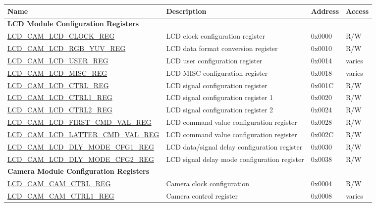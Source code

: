 \begin{longtable}{ | p{6.4cm} | p{6.8cm} | p{1.3cm} | p{1cm} | }
\hline\rowcolor{lightgray}
\textbf{Name} & \textbf{Description} &  \textbf{Address} & \textbf{Access}   \\ \hline
\endhead
\multicolumn{4}{|l|}{\textbf{LCD Module Configuration Registers}} \\ \hline
\hyperref[regdesc:LCDCAMLCDCLOCKREG]{LCD\_CAM\_LCD\_CLOCK\_REG} & LCD clock configuration register & 0x0000 & R/W \\ \hline
\hyperref[regdesc:LCDCAMLCDRGBYUVREG]{LCD\_CAM\_LCD\_RGB\_YUV\_REG} & LCD data format conversion register & 0x0010 & R/W \\ \hline
\hyperref[regdesc:LCDCAMLCDUSERREG]{LCD\_CAM\_LCD\_USER\_REG} & LCD user configuration register & 0x0014 & varies \\ \hline
\hyperref[regdesc:LCDCAMLCDMISCREG]{LCD\_CAM\_LCD\_MISC\_REG} & LCD MISC configuration register & 0x0018 & varies \\ \hline
\hyperref[regdesc:LCDCAMLCDCTRLREG]{LCD\_CAM\_LCD\_CTRL\_REG} & LCD signal configuration register & 0x001C & R/W \\ \hline
\hyperref[regdesc:LCDCAMLCDCTRL1REG]{LCD\_CAM\_LCD\_CTRL1\_REG} & LCD signal configuration register 1 & 0x0020 & R/W \\ \hline
\hyperref[regdesc:LCDCAMLCDCTRL2REG]{LCD\_CAM\_LCD\_CTRL2\_REG} & LCD signal configuration register 2 & 0x0024 & R/W \\ \hline
\hyperref[regdesc:LCDCAMLCDFIRSTCMDVALREG]{LCD\_CAM\_LCD\_FIRST\_CMD\_VAL\_REG} & LCD command value configuration register & 0x0028 & R/W \\ \hline
\hyperref[regdesc:LCDCAMLCDLATTERCMDVALREG]{LCD\_CAM\_LCD\_LATTER\_CMD\_VAL\_REG} & LCD command value configuration register & 0x002C & R/W \\ \hline
\hyperref[regdesc:LCDCAMLCDDLYMODECFG1REG]{LCD\_CAM\_LCD\_DLY\_MODE\_CFG1\_REG} & LCD data/signal delay configuration register & 0x0030 & R/W \\ \hline
\hyperref[regdesc:LCDCAMLCDDLYMODECFG2REG]{LCD\_CAM\_LCD\_DLY\_MODE\_CFG2\_REG} & LCD signal delay mode configuration register & 0x0038 & R/W \\ \hline
\multicolumn{4}{|l|}{\textbf{Camera Module Configuration Registers}} \\ \hline
\hyperref[regdesc:LCDCAMCAMCTRLREG]{LCD\_CAM\_CAM\_CTRL\_REG} & Camera clock configuration & 0x0004 & R/W \\ \hline
\hyperref[regdesc:LCDCAMCAMCTRL1REG]{LCD\_CAM\_CAM\_CTRL1\_REG} & Camera control register  & 0x0008 & varies \\ \hline

\end{longtable}
